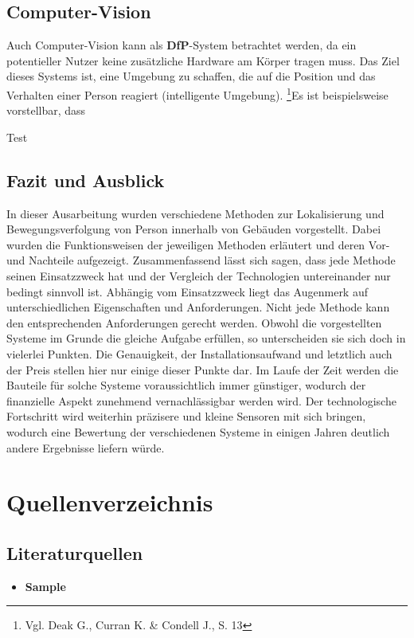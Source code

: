 \subsection{Computer-Vision}
Auch Computer-Vision kann als \textbf{DfP}-System betrachtet werden, da ein potentieller Nutzer keine zusätzliche Hardware am Körper tragen muss. Das Ziel dieses Systems ist, eine Umgebung zu schaffen, die auf die Position und das Verhalten einer Person reagiert (intelligente Umgebung). \footnote{Vgl. Deak G., Curran K. \& Condell J., S. 13}\newline Es ist beispielsweise vorstellbar, dass 

Test

\subsection{Fazit und Ausblick}
In dieser Ausarbeitung wurden verschiedene Methoden zur Lokalisierung und Bewegungsverfolgung von Person innerhalb von Gebäuden vorgestellt. Dabei wurden die Funktionsweisen der jeweiligen Methoden erläutert und deren Vor- und Nachteile aufgezeigt.\newline\newline 
Zusammenfassend lässt sich sagen, dass jede Methode seinen Einsatzzweck hat und der Vergleich der Technologien untereinander nur bedingt sinnvoll ist. Abhängig vom Einsatzzweck liegt das Augenmerk auf unterschiedlichen Eigenschaften und Anforderungen. Nicht jede Methode kann den entsprechenden Anforderungen gerecht werden. Obwohl die vorgestellten Systeme im Grunde die gleiche Aufgabe erfüllen, so unterscheiden sie sich doch in vielerlei Punkten. Die Genauigkeit, der Installationsaufwand und letztlich auch der Preis stellen hier nur einige dieser Punkte dar. \newline\newline
Im Laufe der Zeit werden die Bauteile für solche Systeme voraussichtlich immer günstiger, wodurch der finanzielle Aspekt zunehmend vernachlässigbar werden wird. Der technologische Fortschritt wird weiterhin präzisere und kleine Sensoren mit sich bringen, wodurch eine Bewertung der verschiedenen Systeme in einigen Jahren deutlich andere Ergebnisse liefern würde. 

\newpage

\section{Quellenverzeichnis}
\subsection*{Literaturquellen}
\begin{itemize}[leftmargin=*]
\item[] \textbf{Sample}
\end{itemize}

